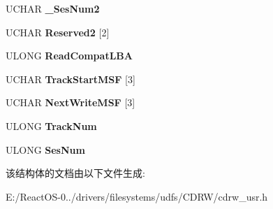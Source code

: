 \begin{DoxyCompactItemize}
U\+C\+H\+AR {\bfseries \+\_\+\+Ses\+Num2}
\item 
\mbox{\label{struct___t_r_a_c_k___i_n_f_o___b_l_o_c_k___u_s_e_r___o_u_t_a06f023621d3dfab9773c02c3026a91d2}} 
U\+C\+H\+AR {\bfseries Reserved2} \mbox{[}2\mbox{]}
\item 
\mbox{\label{struct___t_r_a_c_k___i_n_f_o___b_l_o_c_k___u_s_e_r___o_u_t_acb0b27742451c11a561f48a2249edb5f}} 
U\+L\+O\+NG {\bfseries Read\+Compat\+L\+BA}
\item 
\mbox{\label{struct___t_r_a_c_k___i_n_f_o___b_l_o_c_k___u_s_e_r___o_u_t_a4901e3378c451e08eced8f2038271c82}} 
U\+C\+H\+AR {\bfseries Track\+Start\+M\+SF} \mbox{[}3\mbox{]}
\item 
\mbox{\label{struct___t_r_a_c_k___i_n_f_o___b_l_o_c_k___u_s_e_r___o_u_t_ad415513ed32761bede7f79c2257b570e}} 
U\+C\+H\+AR {\bfseries Next\+Write\+M\+SF} \mbox{[}3\mbox{]}
\item 
\mbox{\label{struct___t_r_a_c_k___i_n_f_o___b_l_o_c_k___u_s_e_r___o_u_t_aeb5a53f091461f2d63da032d1de85ecf}} 
U\+L\+O\+NG {\bfseries Track\+Num}
\item 
\mbox{\label{struct___t_r_a_c_k___i_n_f_o___b_l_o_c_k___u_s_e_r___o_u_t_a50921a012c45047b8675a358d0c482c5}} 
U\+L\+O\+NG {\bfseries Ses\+Num}
\end{DoxyCompactItemize}


该结构体的文档由以下文件生成\+:\begin{DoxyCompactItemize}
\item 
E\+:/\+React\+O\+S-\/0../drivers/filesystems/udfs/\+C\+D\+R\+W/cdrw\+\_\+usr.\+h\end{DoxyCompactItemize}
